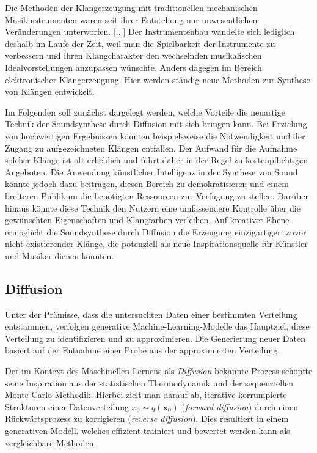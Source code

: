 \documentclass[
  a4paper,  %
  twoside,  %
  bibliography=totoc,
  headsepline,
  cleardoublepage=empty,
  parskip=half,
  draft=false
]{scrbook}
\begin{document}
\glqq Die Methoden der Klangerzeugung mit traditionellen mechanischen Musikinstrumenten waren seit ihrer Entstehung nur unwesentlichen Veränderungen unterworfen. [...] Der Instrumentenbau wandelte sich lediglich deshalb im Laufe der Zeit, weil man die Spielbarkeit der Instrumente zu verbessern und ihren Klangcharakter den wechselnden musikalischen Idealvorstellungen anzupassen wünschte. Anders dagegen im Bereich elektronischer Klangerzeugung. Hier werden ständig neue Methoden zur Synthese von Klängen entwickelt.\grqq \, \cite{ruschkowski_elektronische_2019}

Im Folgenden soll zunächst dargelegt werden, welche Vorteile die neuartige Technik der Soundsynthese durch Diffusion mit sich bringen kann. Bei Erzielung von hochwertigen Ergebnissen könnten beispielsweise die Notwendigkeit und der Zugang zu aufgezeichneten Klängen entfallen. Der Aufwand für die Aufnahme solcher Klänge ist oft erheblich und führt daher in der Regel zu kostenpflichtigen Angeboten. Die Anwendung künstlicher Intelligenz in der Synthese von Sound könnte jedoch dazu beitragen, diesen Bereich zu demokratisieren und einem breiteren Publikum die benötigten Ressourcen zur Verfügung zu stellen. Darüber hinaus könnte diese Technik den Nutzern eine umfassendere Kontrolle über die gewünschten Eigenschaften und Klangfarben verleihen. Auf kreativer Ebene ermöglicht die Soundsynthese durch Diffusion die Erzeugung einzigartiger, zuvor nicht existierender Klänge, die potenziell als neue Inspirationsquelle für Künstler und Musiker dienen könnten. \cite{haohe_liu_audioldm_2023}


\subsection{Diffusion}
Unter der Prämisse, dass die untersuchten Daten einer bestimmten Verteilung entstammen, verfolgen generative Machine-Learning-Modelle das Hauptziel, diese Verteilung zu identifizieren und zu approximieren. Die Generierung neuer Daten basiert auf der Entnahme einer Probe aus der approximierten Verteilung.\cite{machine_learning_at_berkeley_diffusion_2022}

Der im Kontext des Maschinellen Lernens als \emph{Diffusion} bekannte Prozess\cite{sohl-dickstein_deep_2015, ho_denoising_2020, nichol_improved_2021, dhariwal_diffusion_2021} schöpfte seine Inspiration aus der statistischen Thermodynamik\cite{jarzynski_equilibrium_1997} und der sequenziellen Monte-Carlo-Methodik\cite{neal_annealed_1998}. Hierbei zielt man darauf ab, iterative korrumpierte Strukturen einer Datenverteilung $x_0\sim q(\mathbf{x}_0)$ (\emph{forward diffusion}) durch einen Rückwärtsprozess zu korrigieren (\emph{reverse diffusion}). Dies resultiert in einem generativen Modell, welches effizient trainiert und bewertet werden kann als vergleichbare Methoden.\cite{sohl-dickstein_deep_2015, nichol_improved_2021}
\end{document}
